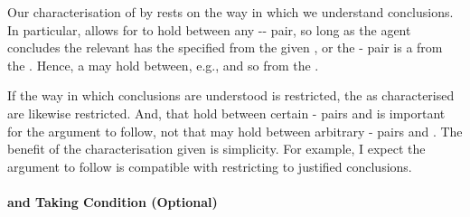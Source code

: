 \begin{note}
  Our characterisation of \ros{} by \supportI{} rests on the way in which we understand conclusions.
  In particular, \supportI{} allows for \ros{} to hold between any -- pair, so long as the agent concludes the relevant  has the specified  from the given \pool{}, or the - pair is a \fc{} from the \pool{}.
  Hence, a \ros{} may hold between, e.g.,  and so \pool{} from the \agpe{}.

  If the way in which conclusions are understood is restricted, the \ros{} as characterised are likewise restricted.
  And, that  hold between certain - pairs and  is important for the argument to follow, not that  may hold between arbitrary - pairs and .
  The benefit of the characterisation given is simplicity.
  For example, I expect the argument to follow is compatible with restricting \ros{} to justified conclusions.
\end{note}

\paragraph*{ and \citeauthor{Boghossian:2014aa} Taking Condition \hfill (Optional)}

